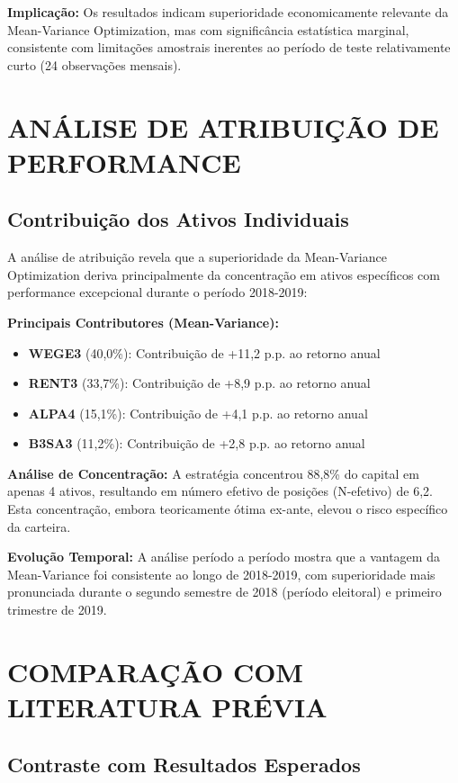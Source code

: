 \textbf{Implicação:} Os resultados indicam superioridade economicamente relevante da Mean-Variance Optimization, mas com significância estatística marginal, consistente com limitações amostrais inerentes ao período de teste relativamente curto (24 observações mensais).

\section{ANÁLISE DE ATRIBUIÇÃO DE PERFORMANCE}

\subsection{Contribuição dos Ativos Individuais}

A análise de atribuição revela que a superioridade da Mean-Variance Optimization deriva principalmente da concentração em ativos específicos com performance excepcional durante o período 2018-2019:

\textbf{Principais Contributores (Mean-Variance):}
\begin{itemize}
    \item \textbf{WEGE3} (40,0\%): Contribuição de +11,2 p.p. ao retorno anual
    \item \textbf{RENT3} (33,7\%): Contribuição de +8,9 p.p. ao retorno anual
    \item \textbf{ALPA4} (15,1\%): Contribuição de +4,1 p.p. ao retorno anual
    \item \textbf{B3SA3} (11,2\%): Contribuição de +2,8 p.p. ao retorno anual
\end{itemize}

\textbf{Análise de Concentração:} A estratégia concentrou 88,8\% do capital em apenas 4 ativos, resultando em número efetivo de posições (N-efetivo) de 6,2. Esta concentração, embora teoricamente ótima ex-ante, elevou o risco específico da carteira.

\textbf{Evolução Temporal:} A análise período a período mostra que a vantagem da Mean-Variance foi consistente ao longo de 2018-2019, com superioridade mais pronunciada durante o segundo semestre de 2018 (período eleitoral) e primeiro trimestre de 2019.

\section{COMPARAÇÃO COM LITERATURA PRÉVIA}

\subsection{Contraste com Resultados Esperados}

